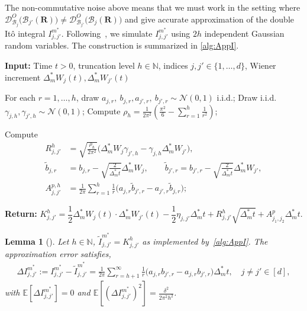 \documentclass[11pt, a4paper, onecolumn]{article}
\newcommand{\E}{\mathbb{E}}
\newcommand{\DO}{\tg D^{O}}
\newcommand{\bfR}{\mathbf{R}}
\newcommand{\B}{\mathcal{B}}
\newcommand{\tg}[1]{\mathcal{#1}}
\newcommand{\ms}{{m^*}}
\newcommand{\Dms}{{\Delta^{*}_{m}}}
\newcommand{\Ijjpms}{ {I_{j,j'}^{\ms}} }
\newcommand{\tIjjpms}{ { \tilde I_{j,j'}^{\ms}} }
\newcommand{\DIjjpms}{\Delta{I_{j,j'}^{\ms}}}
\newcommand{\Der}[4]{
  #1_{#2}\bigl(#3(#4)\bigr)
}
\newcommand{\DerDOjjp}[1]{\Der{\DO}{\B_j}{\B_{j'}}{#1}}
\newcommand{\DerDOjpj}[1]{\Der{\DO}{\B_{j'}}{\B_{j}}{#1}}
\newtheorem{lemma}{Lemma}
\begin{document}
The non-commutative noise above means that we must work in the setting where $\DerDOjjp{\bfR} \neq \DerDOjpj{\bfR}$ and give accurate approximation of the double It\^o integral $\Ijjpms$. Following~\cite{kastner2023analysis}, we simulate $\Ijjpms$ using $2h$ independent Gaussian random variables. The construction is summarized in \cref{alg:AppI}.
\begin{algorithm}[t]
    \caption{Approximate $\Ijjpms(t)$~\cite{kastner2023analysis}}
    \label{alg:AppI}
    \begin{algorithmic}[1]
        \State \textbf{Input:} Time $t>0$, truncation level $h\in\mathbb N$, indices $j,j'\in\{1,\dots,d\}$, Wiener increment $\Dms W_j(t),\Dms W_{j'}(t)$
        
        \State For each $r=1,\dots,h$, draw $a_{j,r},\ b_{j,r},a_{j',r},\ b_{j',r}\sim \mathcal N(0,1)$ i.i.d.;
        \State Draw i.i.d. $\gamma_{j,h} , \gamma_{j',h}\sim \mathcal N(0,1)$;
        \State Compute $\rho_h = \frac{1}{2\pi^2}\left(\frac{\pi^2}{6}-\sum_{r=1}^{h}\frac{1}{r^2}\right)$;
        
        \State Compute
        \begin{align*}
             R_{j,j'}^h &= \sqrt{\frac{\rho_h }{2\pi^2}} \Big( \Dms W_j \gamma_{j',h} - \gamma_{j,h} \Dms W_{j'}\Big), \\
             \tilde b_{j,r} &= b_{j,r} - \sqrt{\tfrac{2}{\Dms t}}\Dms W_j, \qquad \tilde b_{j',r} = b_{j',r} - \sqrt{\tfrac{2}{\Dms t}}\Dms W_{j'}, \\
             A^{p,h}_{j,j'} &= \frac{1}{2\pi}\sum_{r=1}^{h}\frac{1}{r}\Big(a_{j,r}\tilde b_{j',r} -a_{j',r}\tilde b_{j,r}\Big); 
        \end{align*}
        
        \State \textbf{Return:} $K_{j,j'}^h = \dfrac{1}{2}\Dms W_j(t)\cdot \Dms W_{j'}(t) - \dfrac{1}{2} \eta_{j,j'}\Dms t + R_{j,j'}^h \sqrt{\Dms t} + A^{p}_{j_1,j_2}  \Dms t$.
    \end{algorithmic}
\end{algorithm}

\begin{lemma}[\cite{kastner2023analysis}]\label{lem:DI1-DI2}
Let $h\in \mathbb N$, $\tIjjpms = K_{j,j'}^h$ as implemented by~\cref{alg:AppI}. The approximation error satisfies,
\begin{align*}
    \DIjjpms := \Ijjpms - \tIjjpms = \frac{1}{2\pi}\sum_{r=h+1}^{\infty}\frac{1}{r}\Big(a_{j,r}b_{j',r}-a_{j,r}b_{j',r}\Big) \Dms t,  \quad j \neq j'\in[d],
\end{align*}
with $\displaystyle\E[\DIjjpms]=0$ and $\displaystyle \E[(\DIjjpms)^2]=\frac{\delta^2}{2\pi^2 h^2}$.
\end{lemma}
\end{document}
